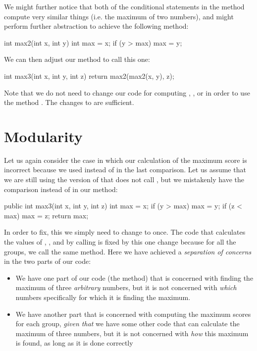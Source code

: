 We might further notice that both of the conditional statements
in the  method
compute very similar things (i.e. the maximum of two numbers),
and might perform further abstraction to achieve the following
method:
\begin{code}
int max2(int x, int y) {
  int max = x;
  if (y > max) {
    max = y; 
  }
}
\end{code}

We can then adjust our  method to call this one:
\begin{code}
int max3(int x, int y, int z) {
  return max2(max2(x, y), z);
}
\end{code}

Note that we do not need to change our code
for computing , ,
or  in order to use the method
. The changes to  are sufficient.

\section{Modularity}\label{sec:modularity}
Let us again consider the case in which our calculation of the maximum
score is incorrect because we used \ic{<} instead of \ic{>} in
the last comparison. Let us assume that we are still using the
version of  that does not call , but
we mistakenly have the comparison  instead of
 in our method:
\begin{code}
public int max3(int x, int y, int z) {
  int max = x;
  if (y > max) {
    max = y;
  }
  if (z < max) {
    max = z;
  }
  return max;
}
\end{code}

In order to fix, this we simply need to change 
to  once. The code that calculates
the values of , ,
and  by calling  is fixed by this
one change because for all the groups, we call the
same method. Here we have achieved a \emph{separation of concerns}
in the two parts of our code:
\begin{itemize}
\item We have one part of our code (the  method)
that is concerned with finding the maximum of three \emph{arbitrary}
numbers, but it is not concerned with \emph{which} numbers
specifically for which it is finding the maximum.
\item We have another part that
is concerned with computing the maximum scores for each group,
\emph{given that} we have some other code that
can calculate the maximum of three numbers, but it is
not concerned with \emph{how} this maximum is found,
as long as it is done correctly
\end{itemize}

